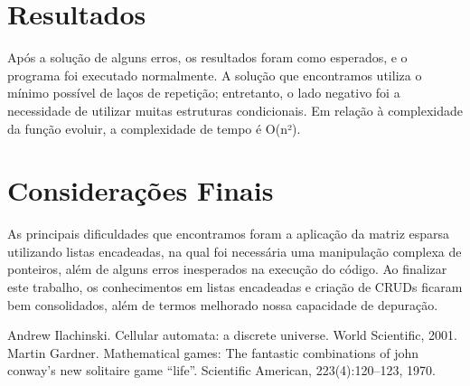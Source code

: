 \documentclass{article}
\begin{document}
\section{Resultados}

Após a solução de alguns erros, os resultados foram como esperados, e o programa foi executado normalmente. A solução que encontramos utiliza o mínimo possível de laços de repetição; entretanto, o lado negativo foi a necessidade de utilizar muitas estruturas condicionais. Em relação à complexidade da função evoluir, a complexidade de tempo é O(n²).

\section{Considerações Finais}
 As principais dificuldades que encontramos foram a aplicação da matriz esparsa utilizando listas encadeadas, na qual foi necessária uma manipulação complexa de ponteiros, além de alguns erros inesperados na execução do código. Ao finalizar este trabalho, os conhecimentos em listas encadeadas e criação de CRUDs ficaram bem consolidados, além de termos melhorado nossa capacidade de depuração.



Andrew Ilachinski. Cellular automata: a discrete universe. World Scientific, 2001. Martin
Gardner. Mathematical games: The fantastic combinations of john conway’s new solitaire game
“life”. Scientific American, 223(4):120–123, 1970.
\end{document}
